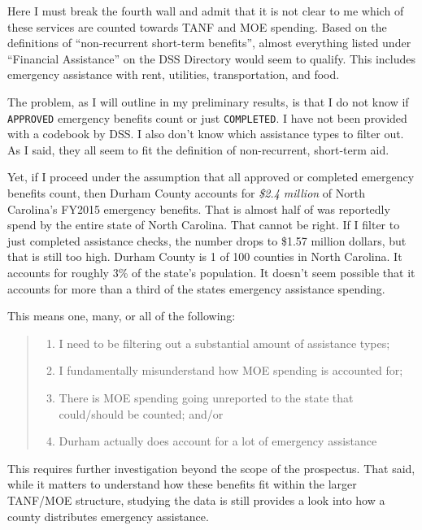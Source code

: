 \documentclass[12pt,letterpaperpaper,]{book}
\providecommand{\tightlist}{%
  \setlength{\itemsep}{0pt}\setlength{\parskip}{0pt}}
\begin{document}
Here I must break the fourth wall and admit that it is not clear to me
which of these services are counted towards TANF and MOE spending. Based
on the definitions of ``non-recurrent short-term benefits'', almost
everything listed under ``Financial Assistance'' on the DSS Directory
would seem to qualify. This includes emergency assistance with rent,
utilities, transportation, and food.

The problem, as I will outline in my preliminary results, is that I do
not know if \texttt{APPROVED} emergency benefits count or just
\texttt{COMPLETED}. I have not been provided with a codebook by DSS. I
also don't know which assistance types to filter out. As I said, they
all seem to fit the definition of non-recurrent, short-term aid.

Yet, if I proceed under the assumption that all approved or completed
emergency benefits count, then Durham County accounts for \emph{\$2.4
million} of North Carolina's FY2015 emergency benefits. That is almost
half of was reportedly spend by the entire state of North Carolina. That
cannot be right. If I filter to just completed assistance checks, the
number drops to \$1.57 million dollars, but that is still too high.
Durham County is 1 of 100 counties in North Carolina. It accounts for
roughly 3\% of the state's population. It doesn't seem possible that it
accounts for more than a third of the states emergency assistance
spending.

This means one, many, or all of the following:

\begin{quote}
\begin{enumerate}
\def\labelenumi{(\arabic{enumi})}
\tightlist
\item
  I need to be filtering out a substantial amount of assistance types;
\item
  I fundamentally misunderstand how MOE spending is accounted for;
\item
  There is MOE spending going unreported to the state that could/should
  be counted; and/or
\item
  Durham actually does account for a lot of emergency assistance
\end{enumerate}
\end{quote}

This requires further investigation beyond the scope of the prospectus.
That said, while it matters to understand how these benefits fit within
the larger TANF/MOE structure, studying the data is still provides a
look into how a county distributes emergency assistance.
\end{document}
